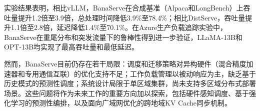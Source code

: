 实验结果表明，相比vLLM，BanaServe在合成基准（Alpaca和LongBench）上吞吐量提升1.2倍至3.9倍，总处理时间降低3.9\%至78.4\%；相比DistServe，吞吐量提升1.1倍至2.8倍，延迟降低1.4\%至70.1\%。在Azure生产负载追踪实验中，BanaServe在重尾分布和突发流量下的鲁棒性得到进一步验证，LLaMA-13B和OPT-13B均实现了最高吞吐量和最低延迟。

然而，BanaServe目前仍存在若干局限：调度和迁移策略对异构硬件（混合精度加速器和专用通信互联）的优化支持不足；工作负载管理以被动响应为主，缺乏基于历史模式的预测性调度；系统设计局限于单区域集群，尚未支持多区域分布式部署场景。这些问题将作为未来工作的重要方向加以探索，包括硬件感知调度、基于强化学习的预测性编排，以及面向广域网优化的跨地域KV Cache同步机制。